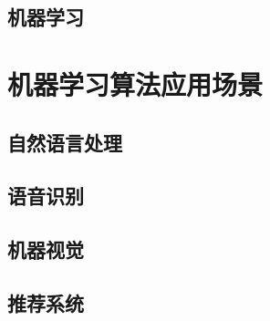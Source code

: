 \documentclass[10pt,aspectratio=43,mathserif,table]{beamer}
\begin{document}
\subsection{机器学习}
\section{机器学习算法应用场景}

\subsection{自然语言处理}

\subsection{语音识别}

\subsection{机器视觉}

\subsection{推荐系统}

\end{document}
